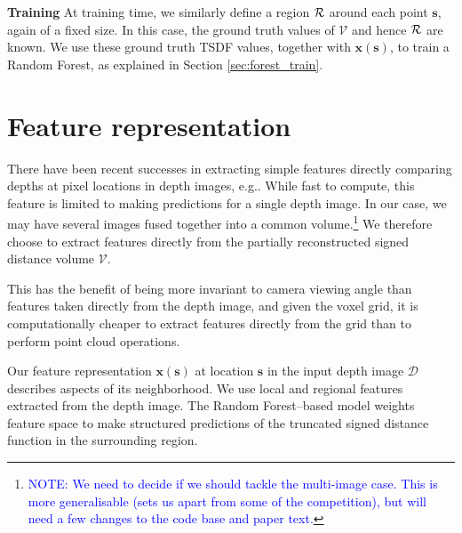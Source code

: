 \documentclass[10pt,twocolumn,letterpaper]{article}
\makeatletter
\renewcommand*{\eg}{e.g.\@\xspace}
\newcommand{\feat}{\mathbf{x}}
\newcommand{\rgbdimage}{\mathcal{D}}
\newcommand{\pixelidx}{\mathbf{s}}
\newcommand{\voxelgrid}{\mathcal{V}}
\newcommand{\note}[1]{\textcolor{blue}{NOTE: #1}}
\renewcommand{\paragraph}{\vspace{2pt}\noindent\textbf}
\makeatother
\begin{document}
\paragraph{Training}
At training time, we similarly define a region $\mathcal{R}$ around each point $\pixelidx$, again of a fixed size.
In this case, the ground truth values of $\voxelgrid$ and hence $\mathcal{R}$ are known.
We use these ground truth TSDF values, together with $\mathbf{x}(\pixelidx)$, to train a Random Forest, as explained in  Section \ref{sec:forest_train}.



\section{Feature representation}
\label{sec:features}

\newcommand{\scalfeat}{x}

There have been recent successes in extracting simple features directly comparing depths at pixel locations in depth images, \eg \cite{shotton-cvpr-2011}.
While fast to compute, this feature is limited to making predictions for a single depth image.
In our case, we may have several images fused together into a common volume.\footnote{\note{We need to decide if we should tackle the multi-image case. This is more generalisable (sets us apart from some of the competition), but will need a few changes to the code base and paper text.}}
We therefore choose to extract features directly from the partially reconstructed signed distance volume $\voxelgrid$.

This has the benefit of being more invariant to camera viewing angle than features taken directly from the depth image, and given the voxel grid, it is computationally cheaper to extract features directly from the grid than to perform point cloud operations.



Our feature representation $\feat(\pixelidx)$ at location $\pixelidx$ in the input depth image $\rgbdimage$  describes aspects of its neighborhood.
We use local and regional features extracted from the depth image.
The Random Forest--based model weights feature space to make structured predictions of the truncated signed distance function in the surrounding region.
\end{document}

